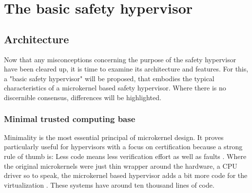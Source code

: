 
\chapter{The basic safety hypervisor} %

\label{Chapter2} %


\newcommand{\keyword}[1]{\textbf{#1}}
\newcommand{\tabhead}[1]{\textbf{#1}}
\newcommand{\code}[1]{\texttt{#1}}
\newcommand{\file}[1]{\texttt{\bfseries#1}}
\newcommand{\option}[1]{\texttt{\itshape#1}}



\section{Architecture}
Now that any misconceptions concerning the purpose of the safety hypervisor have been cleared up, it is time to examine its architecture and features. For this, a "basic safety hypervisor" will be proposed, that embodies the typical characteristics of a microkernel based safety hypervisor. Where there is no discernible consensus, differences will be highlighted.

\subsection{Minimal trusted computing base}
Minimality is the most essential principal of microkernel design. It proves particularly useful for hypervisors with a focus on certification because a strong rule of thumb is: Less code means less verification effort as well as faults \cite{Lipow.1982}.  
Where the original microkernels were just thin wrapper around the hardware, a \gls{CPU} driver so to speak, the microkernel based hypervisor adds a bit more code for the virtualization \cite{Heiser.2010}. These systems have around ten thousand lines of code.

